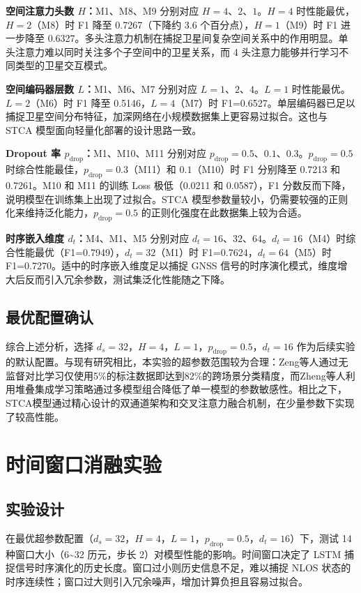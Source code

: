 \textbf{空间注意力头数 $H$：}M1、M8、M9 分别对应 $H=4$、$2$、$1$。$H=4$ 时性能最优，$H=2$（M8）时 F1 降至 0.7267（下降约 3.6 个百分点），$H=1$（M9）时 F1 进一步降至 0.6327。多头注意力机制在捕捉卫星间复杂空间关系中的作用明显。单头注意力难以同时关注多个子空间中的卫星关系，而 4 头注意力能够并行学习不同类型的卫星交互模式。

\textbf{空间编码器层数 $L$：}M1、M6、M7 分别对应 $L=1$、$2$、$4$。$L=1$ 时性能最优。$L=2$（M6）时 F1 降至 0.5146，$L=4$（M7）时 F1=0.6527。单层编码器已足以捕捉卫星空间分布特征，加深网络在小规模数据集上更容易过拟合。这也与 STCA 模型面向轻量化部署的设计思路一致。

\textbf{Dropout 率 $p_\text{drop}$：}M1、M10、M11 分别对应 $p_\text{drop}=0.5$、$0.1$、$0.3$。$p_\text{drop}=0.5$ 时综合性能最佳，$p_\text{drop}=0.3$（M11）和 $0.1$（M10）时 F1 分别降至 0.7213 和 0.7261。M10 和 M11 的训练 Loss 极低（0.0211 和 0.0587），F1 分数反而下降，说明模型在训练集上出现了过拟合。STCA 模型参数量较小，仍需要较强的正则化来维持泛化能力，$p_\text{drop}=0.5$ 的正则化强度在此数据集上较为合适。

\textbf{时序嵌入维度 $d_t$：}M4、M1、M5 分别对应 $d_t=16$、$32$、$64$。$d_t=16$（M4）时综合性能最优（F1=0.7949），$d_t=32$（M1）时 F1=0.7624，$d_t=64$（M5）时 F1=0.7270。适中的时序嵌入维度足以捕捉 GNSS 信号的时序演化模式，维度增大后反而引入冗余参数，测试集泛化性能随之下降。

\subsection{最优配置确认}

综合上述分析，选择 $d_s=32$，$H=4$，$L=1$，$p_\text{drop}=0.5$，$d_t=16$ 作为后续实验的默认配置。与现有研究相比，本实验的超参数范围较为合理：Zeng等人\cite{zeng2026environment}通过无监督对比学习仅使用5\%的标注数据即达到82\%的跨场景分类精度，而Zheng等人\cite{zheng2025stacking}利用堆叠集成学习策略通过多模型组合降低了单一模型的参数敏感性。相比之下，STCA模型通过精心设计的双通道架构和交叉注意力融合机制，在少量参数下实现了较高性能。

\section{时间窗口消融实验}

\subsection{实验设计}

在最优超参数配置（$d_s=32$，$H=4$，$L=1$，$p_\text{drop}=0.5$，$d_t=16$）下，测试 14 种窗口大小（6{\textasciitilde}32 历元，步长 2）对模型性能的影响。时间窗口决定了 LSTM 捕捉信号时序演化的历史长度。窗口过小则历史信息不足，难以捕捉 NLOS 状态的时序连续性；窗口过大则引入冗余噪声，增加计算负担且容易过拟合。

